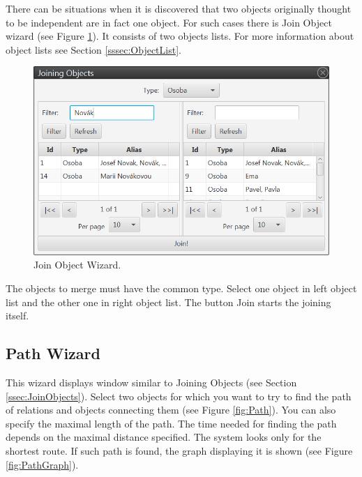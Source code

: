 There can be situations when it is discovered that two objects originally
thought to be independent are in fact one object. For such cases there is Join
Object wizard (see Figure \ref{fig:Join}). It consists of two objects lists. For
more information about object lists see Section \ref{sssec:ObjectList}.

\begin{figure}[!htb]
        \centering
        \includegraphics[width=\textwidth]{Images/join}
        \caption{Join Object Wizard.}
        \label{fig:Join}
\end{figure}

The objects to merge must have the common type. Select one object in left object
list and the other one in right object list. The button Join starts the joining
itself.

\subsection{Path Wizard}
\label{ssec:PathWizard}

This wizard displays window similar to Joining Objects (see Section
\ref{ssec:JoinObjects}). Select two objects for which you want to try to find
the path of relations and objects connecting them (see Figure \ref{fig:Path}).
You can also specify the maximal length of the path. The time needed for finding
the path depends on the maximal distance specified. The system looks only for
the shortest route. If such path is found, the graph displaying it is shown (see
Figure \ref{fig:PathGraph}).

